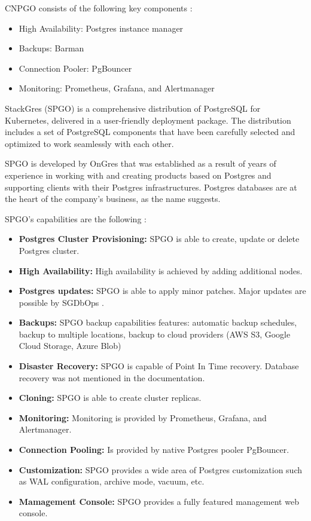 CNPGO consists of the following key components \cite{PostgresOnKubernetes} \cite{CNPGdocuQuickstart}:
\begin{itemize}
  \item High Availability: Postgres instance manager
  \item Backups: Barman
  \item Connection Pooler: PgBouncer
  \item Monitoring: Prometheus, Grafana, and Alertmanager
\end{itemize}


\pagebreak
{}
StackGres (SPGO) is a comprehensive distribution of PostgreSQL for Kubernetes, delivered in a user-friendly deployment package. The distribution includes a set of PostgreSQL components that have been carefully selected and optimized to work seamlessly with each other. \cite{SPGOgitlab}

SPGO is developed by OnGres that was established as a result of years of experience in working with and creating products based on Postgres and supporting clients with their Postgres infrastructures. Postgres databases are at the heart of the company's business, as the name suggests. \cite{OnGres}

SPGO’s capabilities are the following \cite{OnGres}:
\begin{itemize}
  \item \textbf{Postgres Cluster Provisioning:} SPGO is able to create, update or delete Postgres cluster.
  \item \textbf{High Availability:} High availability is achieved by adding additional nodes.
  \item \textbf{Postgres updates:} SPGO is able to apply minor patches. Major updates are possible by SGDbOps \cite{SPGODocuMajorUpdates}.
  \item \textbf{Backups:} SPGO backup capabilities features: automatic backup schedules, backup to multiple locations, backup to cloud providers (AWS S3, Google Cloud Storage, Azure Blob)
  \item \textbf{Disaster Recovery:} SPGO is capable of Point In Time recovery. Database recovery was not mentioned in the documentation.
  \item \textbf{Cloning:} SPGO is able to create cluster replicas.
  \item \textbf{Monitoring:} Monitoring is provided by Prometheus, Grafana, and Alertmanager.
  \item \textbf{Connection Pooling:} Is provided by native Postgres pooler PgBouncer.
  \item \textbf{Customization:} SPGO provides a wide area of Postgres customization such as WAL configuration, archive mode, vacuum, etc. \cite{SPGODocuCustomization}
  \item \textbf{Mamagement Console:} SPGO provides a fully featured management web console.

\end{itemize}

